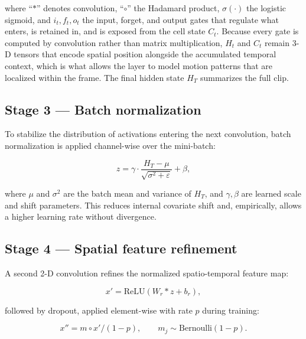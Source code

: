 \documentclass[11pt,a4paper]{article}
\begin{document}
    where ``$*$'' denotes convolution, ``$\circ$'' the Hadamard product, $\sigma(\cdot)$ the logistic sigmoid, and $i_t, f_t, o_t$ the input, forget, and output gates that regulate what enters, is retained in, and is exposed from the cell state $C_t$. Because every gate is computed by convolution rather than matrix multiplication, $H_t$ and $C_t$ remain 3-D tensors that encode spatial position alongside the accumulated temporal context, which is what allows the layer to model motion patterns that are localized within the frame. The final hidden state $H_T$ summarizes the full clip.

    \subsection{Stage 3 --- Batch normalization}

    To stabilize the distribution of activations entering the next convolution, batch normalization is applied channel-wise over the mini-batch:

    \begin{equation}
        z = \gamma \cdot \frac{H_T - \mu}{\sqrt{\sigma^2 + \varepsilon}} + \beta,
        \label{eq:batchnorm}
    \end{equation}

    where $\mu$ and $\sigma^2$ are the batch mean and variance of $H_T$, and $\gamma, \beta$ are learned scale and shift parameters. This reduces internal covariate shift and, empirically, allows a higher learning rate without divergence.

    \subsection{Stage 4 --- Spatial feature refinement}

    A second 2-D convolution refines the normalized spatio-temporal feature map:

    \begin{equation}
        x' = \mathrm{ReLU}(W_r * z + b_r),
        \label{eq:stage4}
    \end{equation}

    followed by dropout, applied element-wise with rate $p$ during training:

    \begin{equation}
        x'' = m \circ x' / (1 - p), \qquad m_j \sim \mathrm{Bernoulli}(1 - p).
        \label{eq:dropout1}
    \end{equation}
\end{document}
